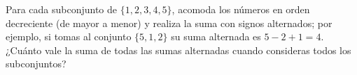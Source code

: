 Para cada subconjunto de $\{1,2,3,4,5\}$, acomoda los números en orden decreciente (de mayor a menor) y realiza la suma con signos alternados; por ejemplo, si tomas al conjunto $\{5, 1, 2\}$ su suma alternada es $5 - 2 + 1 = 4$. ¿Cuánto vale la suma de todas las sumas alternadas cuando consideras todos los subconjuntos?